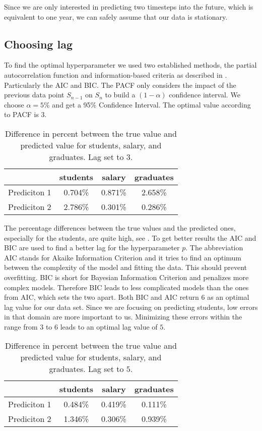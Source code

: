\documentclass{article}
\theoremstyle{plain}
\theoremstyle{definition}
\theoremstyle{remark}
\begin{document}
Since we are only interested in predicting two timesteps into the future, which is equivalent to one year,
we can safely assume that our data is stationary.


\subsection{Choosing lag}\label{sec:methods:lag}
To find the optimal hyperparameter we used two established methods, the partial autocorrelation function and information-based criteria as described in \citep{pacf}. Particularly the AIC and 
BIC. The PACF only considers the impact of the previous data point $S_{n-1}$ on $S_{n}$ to build a $(1-\alpha)$ confidence interval.
We choose $\alpha = 5\%$ and get a 95\% Confidence Interval. The optimal value according to PACF is $3$.
\begin{table}[H]
    \centering
    \begin{tabular}{c|c|c|c}
        & students & salary & graduates \\
        \hline
        Prediciton 1 & 0.704\% & 0.871\% & 2.658\% \\
        \hline
        Prediciton 2 & 2.786\% & 0.301\% & 0.286\%
    \end{tabular}
    \caption{Difference in percent between the true value and predicted value for students, salary, and graduates. Lag set to $3$.}
    \label{tab:resid1}
\end{table}
The percentage differences between the true values and the predicted ones, especially for the students, are quite high, see .
To get better results
the AIC and BIC are used to find a better lag for the hyperparameter $p$. The abbreviation AIC
stands for Akaike Information Criterion and it tries to find an optimum between the complexity of the model and fitting the data.
This should prevent overfitting. 
BIC is short for Bayesian Information Criterion and penalizes more complex models.
Therefore BIC leads to less complicated models than the ones from AIC, which sets the two apart.
Both BIC and AIC return $6$ as an optimal lag value for our data set. Since we are focusing on predicting students, low errors in that domain
are more important to us. Minimizing these errors within the range from $3$ to $6$ leads to an optimal lag value of $5$.
\begin{table}[H]
    \centering
    \begin{tabular}{c|c|c|c}
        & students & salary & graduates \\
        \hline
        Prediciton 1 & 0.484\% & 0.419\% & 0.111\% \\
        \hline
        Prediciton 2 & 1.346\% & 0.306\% & 0.939\%
    \end{tabular}
    \caption{Difference in percent between the true value and predicted value for students, salary, and graduates. Lag set to $5$.}
    \label{tab:resid2}
\end{table}
\end{document}
